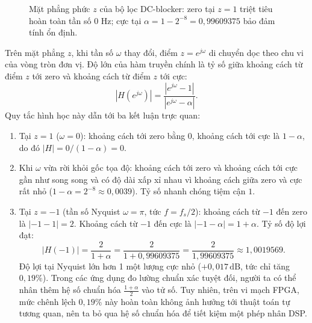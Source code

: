\begin{figure}[H]
\centering
{}
\caption{Mặt phẳng phức $z$ của bộ lọc DC-blocker: zero tại $z = 1$ triệt tiêu hoàn toàn tần số 0 Hz; cực tại $\alpha = 1 - 2^{-8} = 0{,}99609375$ bảo đảm tính ổn định.}
\label{fig:ch03_zplane}
\end{figure}

Trên mặt phẳng $z$, khi tần số $\omega$ thay đổi, điểm $z = e^{j\omega}$ di chuyển dọc theo chu vi của vòng tròn đơn vị. Độ lớn của hàm truyền chính là tỷ số giữa khoảng cách từ điểm $z$ tới zero và khoảng cách từ điểm $z$ tới cực:
\begin{equation}
|H(e^{j\omega})| = \frac{|e^{j\omega} - 1|}{|e^{j\omega} - \alpha|}.
\end{equation}
Quy tắc hình học này dẫn tới ba kết luận trực quan:
\begin{enumerate}
    \item Tại $z = 1$ ($\omega = 0$): khoảng cách tới zero bằng 0, khoảng cách tới cực là $1 - \alpha$, do đó $|H| = 0 / (1 - \alpha) = 0$.
    \item Khi $\omega$ vừa rời khỏi gốc tọa độ: khoảng cách tới zero và khoảng cách tới cực gần như song song và có độ dài xấp xỉ nhau vì khoảng cách giữa zero và cực rất nhỏ ($1 - \alpha = 2^{-8} \approx 0{,}0039$). Tỷ số nhanh chóng tiệm cận $1$.
    \item Tại $z = -1$ (tần số Nyquist $\omega = \pi$, tức $f = f_s / 2$): khoảng cách từ $-1$ đến zero là $|-1 - 1| = 2$. Khoảng cách từ $-1$ đến cực là $|-1 - \alpha| = 1 + \alpha$. Tỷ số độ lợi đạt:
    \begin{equation}
    |H(-1)| = \frac{2}{1 + \alpha} = \frac{2}{1 + 0{,}99609375} = \frac{2}{1{,}99609375} \approx 1{,}0019569.
    \end{equation}
    Độ lợi tại Nyquist lớn hơn 1 một lượng cực nhỏ ($+0{,}017\,\text{dB}$, tức chỉ tăng $0{,}19\%$). Trong các ứng dụng đo lường chuẩn xác tuyệt đối, người ta có thể nhân thêm hệ số chuẩn hóa $\frac{1+\alpha}{2}$ vào tử số. Tuy nhiên, trên vi mạch FPGA, mức chênh lệch $0{,}19\%$ này hoàn toàn không ảnh hưởng tới thuật toán tự tương quan, nên ta bỏ qua hệ số chuẩn hóa để tiết kiệm một phép nhân DSP.
\end{enumerate}

